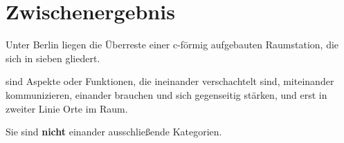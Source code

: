 \section{Zwischenergebnis}

Unter Berlin liegen die Überreste einer c-förmig aufgebauten Raumstation, die sich in sieben  gliedert.

 sind Aspekte oder Funktionen, die ineinander verschachtelt sind, miteinander kommunizieren, einander brauchen und sich gegenseitig stärken, und erst in zweiter Linie  Orte im Raum.

Sie sind \textbf{nicht} einander ausschließende Kategorien.
   

    
